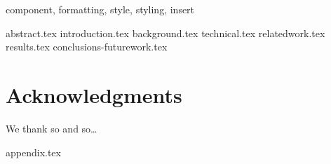 \documentclass[conference]{IEEEtran}
\begin{document}
\maketitle
\pagestyle{plain}


\begin{IEEEkeywords}
component, formatting, style, styling, insert
\end{IEEEkeywords}

{abstract.tex}
{introduction.tex}
{background.tex}
{technical.tex}
{relatedwork.tex}
{results.tex}
{conclusions-futurework.tex}
\section*{Acknowledgments}
We thank so and so\ldots



\newpage
\newpage
{appendix.tex}
\end{document}
